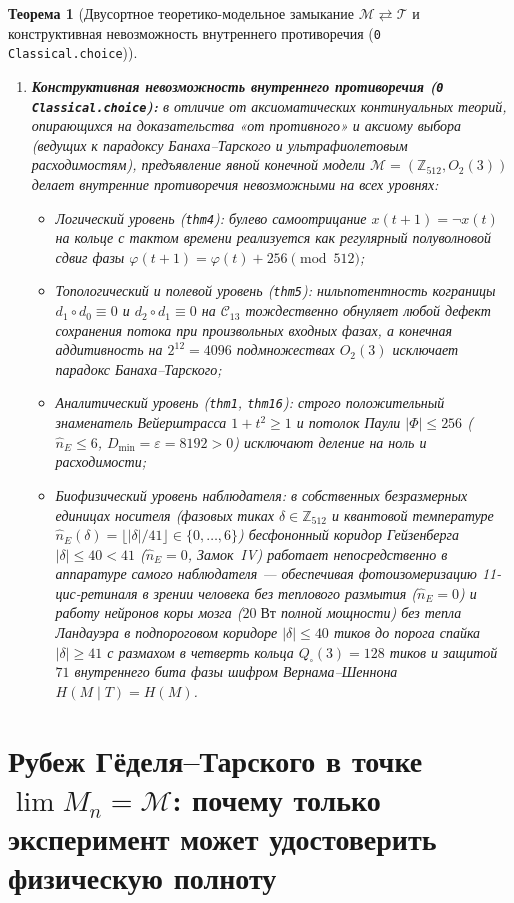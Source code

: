 \documentclass[11pt,a4paper]{article}
\newtheorem{theorem}{Теорема}[section]
\theoremstyle{definition}
\theoremstyle{remark}
\begin{document}
\begin{theorem}[Двусортное теоретико-модельное замыкание $\mathcal{M} \rightleftarrows \mathcal{T}$ и конструктивная невозможность внутреннего противоречия (\texttt{0 Classical.choice})]
\begin{enumerate}[label=\textbf{(\roman*)},leftmargin=*]
\item \textbf{Конструктивная невозможность внутреннего противоречия (\texttt{0 Classical.choice}):}
  в отличие от аксиоматических континуальных теорий, опирающихся на доказательства «от противного» и аксиому выбора (ведущих к парадоксу Банаха--Тарского и ультрафиолетовым расходимостям), предъявление явной конечной модели $\mathcal{M} = (\mathbb{Z}_{512}, O_2(3))$ делает внутренние противоречия невозможными на всех уровнях:
  \begin{itemize}[noitemsep]
  \item \emph{Логический уровень (\texttt{thm4}):} булево самоотрицание $x(t+1) = \neg x(t)$ на кольце с тактом времени реализуется как регулярный полуволновой сдвиг фазы $\varphi(t+1) = \varphi(t) + 256\pmod{512}$;
  \item \emph{Топологический и полевой уровень (\texttt{thm5}):} нильпотентность кограницы $d_1\circ d_0\equiv 0$ и $d_2\circ d_1\equiv 0$ на $\mathcal{C}_{13}$ тождественно обнуляет любой дефект сохранения потока при произвольных входных фазах, а конечная аддитивность на $2^{12}=4096$ подмножествах $O_2(3)$ исключает парадокс Банаха--Тарского;
  \item \emph{Аналитический уровень (\texttt{thm1}, \texttt{thm16}):} строго положительный знаменатель Вейерштрасса $1+t^2\ge 1$ и потолок Паули $|\Phi|\le 256$ ($\hat{n}_E\le 6$, $D_{\min}=\varepsilon=8192>0$) исключают деление на ноль и расходимости;
  \item \emph{Биофизический уровень наблюдателя:} в собственных безразмерных единицах носителя (фазовых тиках $\delta\in\mathbb{Z}_{512}$ и квантовой температуре $\hat{n}_E(\delta) = \lfloor|\delta|/41\rfloor\in\{0,\dots,6\}$) бесфононный коридор Гейзенберга $|\delta|\le 40 < 41$ ($\hat{n}_E=0$, Замок~IV) работает непосредственно в аппаратуре самого наблюдателя --- обеспечивая фотоизомеризацию 11-\emph{цис}-ретиналя в зрении человека без теплового размытия ($\hat{n}_E=0$) и работу нейронов коры мозга ($20\;\text{Вт}$ полной мощности) без тепла Ландауэра в подпороговом коридоре $|\delta|\le 40$ тиков до порога спайка $|\delta|\ge 41$ с размахом в четверть кольца $Q_\square(3)=128$ тиков и защитой $71$ внутреннего бита фазы шифром Вернама--Шеннона $H(M\mid T)=H(M)$.
  \end{itemize}
\end{enumerate}
\end{theorem}

\section{Рубеж Гёделя--Тарского в точке $\lim M_n = \mathcal{M}$: почему только эксперимент может удостоверить физическую полноту}
\label{sec:godel-tarski}
\end{document}
